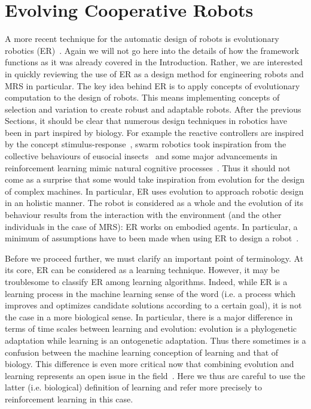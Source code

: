 
\section{Evolving Cooperative Robots}

  A more recent technique for the automatic design of robots is evolutionary robotics (ER)~\parencite{Nolfi2000, Doncieux2015a}. Again we will not go here into the details of how the framework functions as it was already covered in the Introduction. Rather, we are interested in quickly reviewing the use of ER as a design method for engineering robots and MRS in particular. The key idea behind ER is to apply concepts of evolutionary computation to the design of robots. This means implementing concepts of selection and variation to create robust and adaptable robots. After the previous Sections, it should be clear that numerous design techniques in robotics have been in part inspired by biology. For example the reactive controllers are inspired by the concept stimulus-response~\parencite{Brooks1986}, swarm robotics took inspiration from the collective behaviours of eusocial insects~\parencite{Bonabeau1999} and some major advancements in reinforcement learning mimic natural cognitive processes~\parencite{Montague1996}. Thus it should not come as a surprise that some would take inspiration from evolution for the design of complex machines. In particular, ER uses evolution to approach robotic design in an holistic manner. The robot is considered as a whole and the evolution of its behaviour results from the interaction with the environment (and the other individuals in the case of MRS): ER works on embodied agents. In particular, a minimum of assumptions have to been made when using ER to design a robot~\parencite{Bongard2013a}.

  Before we proceed further, we must clarify an important point of terminology. At its core, ER can be considered as a learning technique. However, it may be troublesome to classify ER among learning algorithms. Indeed, while ER is a learning process in the machine learning sense of the word (i.e. a process which improves and optimizes candidate solutions according to a certain goal), it is not the case in a more biological sense. In particular, there is a major difference in terms of time scales between learning and evolution: evolution is a phylogenetic adaptation while learning is an ontogenetic adaptation. Thus there sometimes is a confusion between the machine learning conception of learning and that of biology. This difference is even more critical now that combining evolution and learning represents an open issue in the field~\parencite{Urzelai2001, Mouret2014, Doncieux2015a}. Here we thus are careful to use the latter (i.e. biological) definition of learning and refer more precisely to reinforcement learning in this case.

